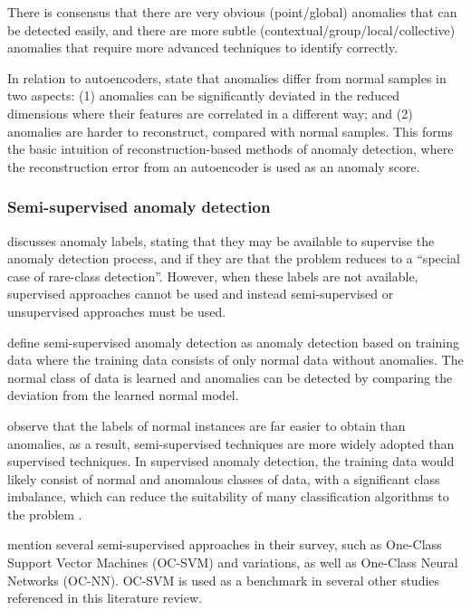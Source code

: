 \documentclass{mproj}
\begin{document}
There is consensus that there are very obvious (point/global) anomalies that can be detected easily, and there are more subtle (contextual/group/local/collective) anomalies that require more advanced techniques to identify correctly.

In relation to autoencoders, \cite{DAGMM} state that anomalies differ from normal samples in two aspects: (1) anomalies can be significantly deviated in the reduced dimensions where their features are correlated in a different way; and (2) anomalies are harder to reconstruct, compared with normal samples. This forms the basic intuition of reconstruction-based methods of anomaly detection, where the reconstruction error from an autoencoder is used as an anomaly score.

\subsubsection{Semi-supervised anomaly detection}

\cite{outlierAnalysisBook} discusses anomaly labels, stating that they may be available to supervise the anomaly detection process, and if they are that the problem reduces to a ``special case of rare-class detection''. However, when these labels are not available, supervised approaches cannot be used and instead semi-supervised or unsupervised approaches must be used.

\cite{comparativeUnsupervisedEvaluation} define semi-supervised anomaly detection as anomaly detection based on training data where the training data consists of only normal data without anomalies. The normal class of data is learned and anomalies can be detected by comparing the deviation from the learned normal model.

\cite{deepLearningSurvey} observe that the labels of normal instances are far easier to obtain than anomalies, as a result, semi-supervised techniques are more widely adopted than supervised techniques.
In supervised anomaly detection, the training data would likely consist of normal and anomalous classes of data, with a significant class imbalance, which can reduce the suitability of many classification algorithms to the problem \citep{comparativeUnsupervisedEvaluation}.

\cite{deepLearningSurvey} mention several semi-supervised approaches in their survey, such as One-Class Support Vector Machines (OC-SVM) and variations, as well as One-Class Neural Networks (OC-NN). OC-SVM is used as a benchmark in several other studies referenced in this literature review.
\end{document}
